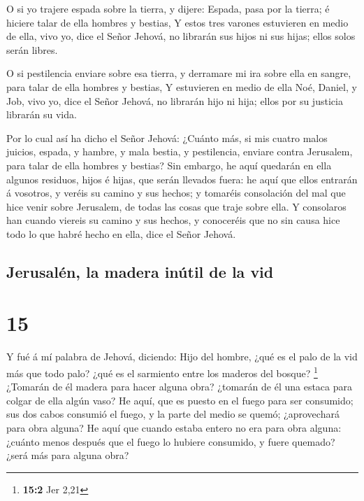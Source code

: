  O si yo trajere espada sobre la tierra, y dijere: Espada,
pasa por la tierra; é hiciere talar de ella hombres y bestias,
 Y estos tres varones estuvieren en medio de ella, vivo yo,
dice el Señor Jehová, no librarán sus hijos ni sus hijas; ellos solos
serán libres.

 O si pestilencia enviare sobre esa tierra, y derramare mi
ira sobre ella en sangre, para talar de ella hombres y bestias,
 Y estuvieren en medio de ella Noé, Daniel, y Job, vivo yo,
dice el Señor Jehová, no librarán hijo ni hija; ellos por su justicia
librarán su vida.

 Por lo cual así ha dicho el Señor Jehová: ¿Cuánto más, si
mis cuatro malos juicios, espada, y hambre, y mala bestia, y
pestilencia, enviare contra Jerusalem, para talar de ella hombres y
bestias?  Sin embargo, he aquí quedarán en ella algunos
residuos, hijos é hijas, que serán llevados fuera: he aquí que ellos
entrarán á vosotros, y veréis su camino y sus hechos; y tomaréis
consolación del mal que hice venir sobre Jerusalem, de todas las cosas
que traje sobre ella.  Y consolaros han cuando viereis su
camino y sus hechos, y conoceréis que no sin causa hice todo lo que
habré hecho en ella, dice el Señor Jehová.

\hypertarget{jerusaluxe9n-la-madera-inuxfatil-de-la-vid}{%
\subsection{Jerusalén, la madera inútil de la
vid}\label{jerusaluxe9n-la-madera-inuxfatil-de-la-vid}}

\hypertarget{section-14}{%
\section{15}\label{section-14}}

 Y fué á mí palabra de Jehová, diciendo:  Hijo
del hombre, ¿qué es el palo de la vid más que todo palo? ¿qué es el
sarmiento entre los maderos del bosque? \footnote{\textbf{15:2} Jer 2,21}
 ¿Tomarán de él madera para hacer alguna obra? ¿tomarán de
él una estaca para colgar de ella algún vaso?  He aquí, que
es puesto en el fuego para ser consumido; sus dos cabos consumió el
fuego, y la parte del medio se quemó; ¿aprovechará para obra alguna?
 He aquí que cuando estaba entero no era para obra alguna:
¿cuánto menos después que el fuego lo hubiere consumido, y fuere
quemado? ¿será más para alguna obra?

